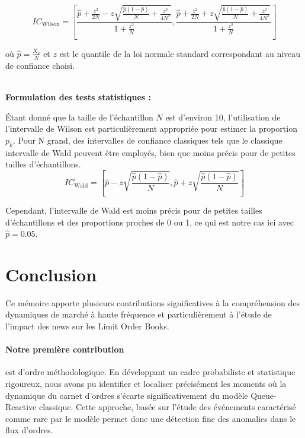 \documentclass[12pt,a4paper]{article}
\theoremstyle{definition}
\theoremstyle{remark}
\begin{document}
    \[
    IC_{\text{Wilson}} = \left[ \frac{\hat{p} + \frac{z^2}{2N} - z \sqrt{ \frac{\hat{p}(1 - \hat{p})}{N} + \frac{z^2}{4N^2} }}{ 1 + \frac{z^2}{N} }, \frac{\hat{p} + \frac{z^2}{2N} + z \sqrt{ \frac{\hat{p}(1 - \hat{p})}{N} + \frac{z^2}{4N^2} }}{ 1 + \frac{z^2}{N} } \right]
    \]

    où $\hat{p} = \frac{X_k}{N}$ et $z$ est le quantile de la loi normale standard correspondant au niveau de confiance choisi.

\\

    \textbf{Formulation des tests statistiques :}

    Étant donné que la taille de l'échantillon $N$ est d'environ 10, l'utilisation de l'intervalle de Wilson est particulièrement appropriée pour estimer la proportion $p_k$. Pour N grand, des intervalles de confiance classiques tels que le classique intervalle de Wald peuvent être employés, bien que moins précis pour de petites tailles d'échantillons. 
    \[
    IC_{\text{Wald}} = \left[ \hat{p} - z \sqrt{ \frac{\hat{p}(1 - \hat{p})}{N} }, \hat{p} + z \sqrt{ \frac{\hat{p}(1 - \hat{p})}{N} } \right]
    \]

    Cependant, l'intervalle de Wald est moins précis pour de petites tailles d'échantillons et des proportions proches de 0 ou 1, ce qui est notre cas ici avec $\hat{p} = 0.05$.



    \newpage
\section*{Conclusion}

Ce mémoire apporte plusieurs contributions significatives à la compréhension des dynamiques de marché à haute fréquence et particulièrement à l'étude de l'impact des news sur les Limit Order Books.

\paragraph{\textbf{Notre première contribution}} est d'ordre méthodologique. En développant un cadre probabiliste et statistique rigoureux, nous avons pu identifier et localiser précisément les moments où la dynamique du carnet d'ordres s'écarte significativement du modèle Queue-Reactive classique. Cette approche, basée sur l'étude des événements caractérisé comme rare par le modèle permet donc une détection fine des anomalies dans le flux d'ordres.
\end{document}
